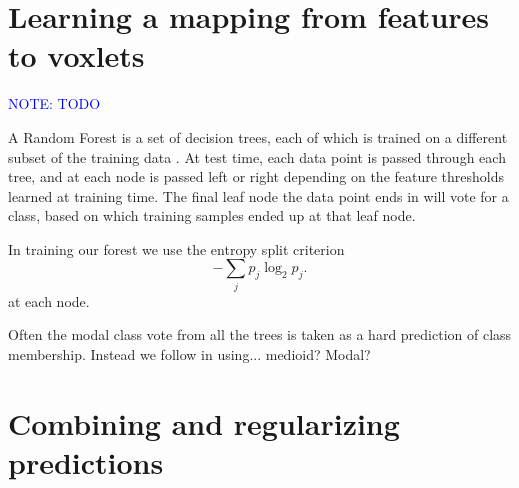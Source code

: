 \documentclass[10pt,twocolumn,letterpaper]{article}
\makeatletter
\renewcommand*{\eg}{e.g.\@\xspace}
\newcommand{\note}[1]{\textcolor{blue}{NOTE: #1}}
\makeatother
\begin{document}
\section{Learning a mapping from features to voxlets}
\label{sec:forest_train}

\note{TODO}

A Random Forest is a set of decision trees, each of which is trained on a different subset of the training data \cite{breiman-ml-2001}.
At test time, each data point is passed through each tree, and at each node is passed left or right depending on the feature thresholds learned at training time. The final leaf node the data point ends in will vote for a class, based on which training samples ended up at that leaf node.


In training our forest we use the entropy split criterion
\begin{equation}
- \sum_j p_j \log_2 p_j.
\end{equation}
at each node.

Often the modal class vote from all the trees is taken as a hard prediction of class membership. Instead we follow \cite{} in using... medioid? Modal?





\section{Combining and regularizing predictions}
\end{document}
